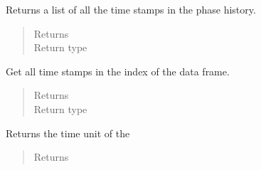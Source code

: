 \documentclass[letterpaper,10pt,openany,oneside,english]{sphinxmanual}
\begin{document}
\begin{fulllineitems}
\begin{fulllineitems}
\begin{quote}
\begin{description}
\end{description}\end{quote}

\end{fulllineitems}


\begin{fulllineitems}
\label{\detokenize{support_rst/phase:phase.Phase.timeStamps}}
Returns a list of all the time stamps in the phase history.
\begin{quote}\begin{description}
\item[{Returns}] \leavevmode
{}

\item[{Return type}] \leavevmode
{}

\end{description}\end{quote}

\end{fulllineitems}


\begin{fulllineitems}
\label{\detokenize{support_rst/phase:phase.Phase.time_stamps}}
Get all time stamps in the index of the data frame.
\begin{quote}\begin{description}
\item[{Returns}] \leavevmode
{}

\item[{Return type}] \leavevmode
{}

\end{description}\end{quote}

\end{fulllineitems}


\begin{fulllineitems}
\label{\detokenize{support_rst/phase:phase.Phase.time_unit}}
Returns the time unit of the 
\begin{quote}\begin{description}
\item[{Returns}] \leavevmode
{}


\end{description}
\end{quote}
\end{fulllineitems}
\end{fulllineitems}
\end{document}
